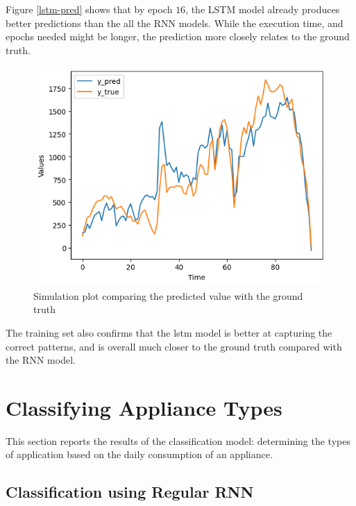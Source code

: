 \documentclass[a4paper, article, oneside, USenglish, IN5460]{memoir}
\begin{document}
Figure \ref{lstm-pred} shows that by epoch $16$, the LSTM model already produces better predictions than the all the RNN models. While the execution time, and epochs needed might be longer, the prediction more closely relates to the ground truth.




\begin{figure}[H]
  \centering
    \includegraphics[width=\textwidth]{report/figures/lstm-pred.png}
  \caption{Simulation plot comparing the predicted value with the ground truth}
  \label{lstm-pred-train}
\end{figure}

The training set also confirms that the lstm model is better at capturing the correct patterns, and is overall much closer to the ground truth compared with the RNN model.



\chapter{Classifying Appliance Types}

This section reports the results of the classification model: determining the types of application based on the daily consumption of an appliance.

\section{Classification using Regular RNN}
\end{document}
